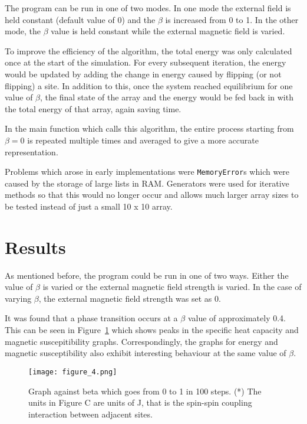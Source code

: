 \documentclass[11pt]{article}
\begin{document}
The program can be run in one of two modes. In one mode the external field is held constant (default value of 0) and the $\beta$ is increased from 0 to 1. In the other mode, the $\beta$ value is held constant while the external magnetic field is varied.

To improve the efficiency of the algorithm, the total energy was only calculated once at the start of the simulation. For every subsequent iteration, the energy would be updated by adding the change in energy caused by flipping (or not flipping) a site. In addition to this, once the system reached equilibrium for one value of $\beta$, the final state of the array and the energy would be fed back in with the total energy of that array, again saving time.

In the main function which calls this algorithm, the entire process starting from $\beta=0$ is repeated multiple times and averaged to give a more accurate representation.

Problems which arose in early implementations were \texttt{MemoryError}s which were caused by the storage of large lists in RAM. Generators were used for iterative methods so that this would no longer occur and allows much larger array sizes to be tested instead of just a small 10 x 10 array.

\section*{Results}
As mentioned before, the program could be run in one of two ways. Either the value of $\beta$ is varied or the external magnetic field strength is varied. In the case of varying $\beta$, the external magnetic field strength was set as $0$.

It was found that a phase transition occurs at a $\beta$ value of approximately 0.4. This can be seen in Figure~\ref{fig:changingbeta} which shows peaks in the specific heat capacity and magnetic suscepitibility graphs. Correspondingly, the graphs for energy and magnetic susceptibility also exhibit interesting behaviour at the same value of $\beta$.

\begin{figure}[!ht]
\centering
\texttt{[image: figure\_4.png]}
\caption{Graph against beta which goes from 0 to 1 in 100 steps. (*) The units in Figure C are units of J, that is the spin-spin coupling interaction between adjacent sites.}
\label{fig:changingbeta}
\end{figure}
\end{document}
